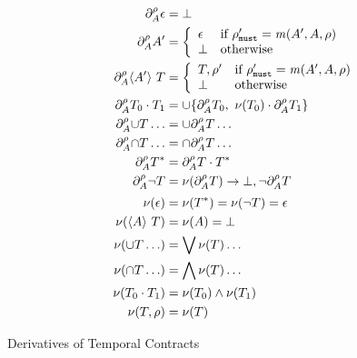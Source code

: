   {\begin{align*}
      \partial_{A}^{\rho}{\epsilon} &= \bot
      \\
      \partial_{A}^{\rho}{A'} &= \left\{
        \begin{array}{ll}
          \epsilon & \text{if } \rho'_{\tt must} = \mathit{m}(A', A, \rho) \\
          \bot & \text{otherwise}
        \end{array}\right.
      \\
      \partial_{A}^{\rho}{\langle A'\rangle\ T} &=
      \left\{\begin{array}{ll}
          T,\rho' & \text{if } \rho'_{\tt must} = \mathit{m}(A', A, \rho) \\
          \bot & \text{otherwise}
        \end{array}\right.
      \\
      \partial_{A}^{\rho}{T_0 \cdot T_1} &=
      \cup \{\partial_{A}^{\rho}{T_0},\
          \nu(T_0) \cdot \partial_{A}^{\rho}{T_1}\}
      \\
      \partial_{A}^{\rho}{\cup T\ldots} &=
      \cup \partial_{A}^{\rho}{T}\ldots
      \\
      \partial_{A}^{\rho}{\cap T\ldots} &=
      \cap \partial_{A}^{\rho}{T}\ldots
      \\
      \partial_{A}^{\rho}{T^*} &=
      \partial_{A}^{\rho}{T} \cdot T^*
      \\
      \partial_{A}^{\rho}{\neg T} &=
      \nu(\partial_{A}^{\rho}{T}) \to \bot,
      \neg \partial_{A}^{\rho}{T}
      \\[2pt]
      \nu(\epsilon) &= \nu(T^*) =
      \nu(\neg T) = \epsilon
      \\
      \nu(\langle A\rangle\ T) &= \nu(A) = \bot
      \\
      \nu(\cup T\ldots) &=
      \bigvee{\nu(T)\ldots}
      \\
      \nu(\cap T\ldots) &=
      \bigwedge{\nu(T)\ldots}
      \\
      \nu(T_0 \cdot T_1) &=
      \nu(T_0)\wedge \nu(T_1)
      \\
      \nu(T,\rho) &= \nu(T)
    \end{align*}}{\caption{Derivatives of Temporal Contracts}\label{fig:tcon-deriv}}

